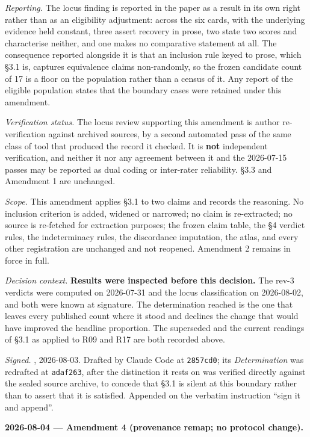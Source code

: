 \emph{Reporting.} The locus finding is reported in the paper as a result in its own right rather than as an eligibility adjustment: across the six cards, with the underlying evidence held constant, three assert recovery in prose, two state two scores and characterise neither, and one makes no comparative statement at all. The consequence reported alongside it is that an inclusion rule keyed to prose, which \S{}3.1 is, captures equivalence claims non-randomly, so the frozen candidate count of 17 is a floor on the population rather than a census of it. Any report of the eligible population states that the boundary cases were retained under this amendment.

\emph{Verification status.} The locus review supporting this amendment is author re-verification against archived sources, by a second automated pass of the same class of tool that produced the record it checked. It is \textbf{not} independent verification, and neither it nor any agreement between it and the 2026-07-15 passes may be reported as dual coding or inter-rater reliability. \S{}3.3 and Amendment 1 are unchanged.

\emph{Scope.} This amendment applies \S{}3.1 to two claims and records the reasoning. No inclusion criterion is added, widened or narrowed; no claim is re-extracted; no source is re-fetched for extraction purposes; the frozen claim table, the \S{}4 verdict rules, the indeterminacy rules, the discordance imputation, the atlas, and every other registration are unchanged and not reopened. Amendment 2 remains in force in full.

\emph{Decision context.} \textbf{Results were inspected before this decision.} The rev-3 verdicts were computed on 2026-07-31 and the locus classification on 2026-08-02, and both were known at signature. The determination reached is the one that leaves every published count where it stood and declines the change that would have improved the headline proportion. The superseded and the current readings of \S{}3.1 as applied to R09 and R17 are both recorded above.

\emph{Signed.} \authorname{}, 2026-08-03. Drafted by Claude Code at \texttt{2857cd0}; its \emph{Determination} was redrafted at \texttt{adaf263}, after the distinction it rests on was verified directly against the sealed source archive, to concede that \S{}3.1 is silent at this boundary rather than to assert that it is satisfied. Appended on the verbatim instruction ``sign it and append''.

\textbf{2026-08-04 --- Amendment 4 (provenance remap; no protocol change).}

